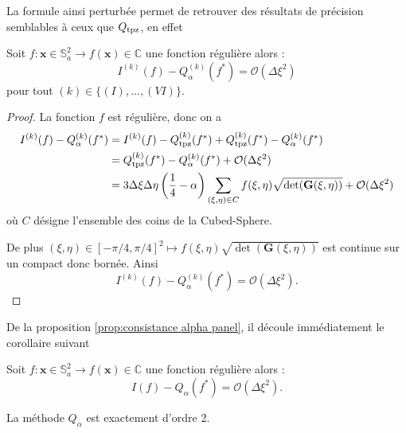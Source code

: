 La formule ainsi perturbée permet de retrouver des résultats de précision semblables à ceux que $Q_{\text{tpz}}$, en effet
\begin{proposition}
Soit $f: \mathbf{x} \in \mathbb{S}_a^2 \rightarrow f(\mathbf{x}) \in \mathbb{C}$ une fonction régulière alors :
\begin{equation}
I^{(k)}(f) - Q^{(k)}_{\alpha}(f^*) = \mathcal{O} \left( \Delta \xi^2 \right)
\end{equation}
pour tout $(k) \in \lbrace (I), ..., (VI) \rbrace$.
\label{prop:consistance alpha panel}
\end{proposition}

\begin{proof}
La fonction $f$ est régulière, donc on a
\begin{align*}
I^{(k)}(f) - Q^{(k)}_{\alpha}(f^*) & = I^{(k)}(f) - Q^{(k)}_{\text{tpz}}(f^*) + Q^{(k)}_{\text{tpz}}(f^*) - Q^{(k)}_{\alpha}(f^*)\\
	& =  Q^{(k)}_{\text{tpz}}(f^*) - Q^{(k)}_{\alpha}(f^*) + \mathcal{O}(\Delta \xi^2) \\
	& = 3\Delta \xi \Delta \eta \left( \dfrac{1}{4} - \alpha \right) \displaystyle\sum\limits_{(\xi, \eta) \in C} f(\xi, \eta) \sqrt{\det(\mathbf{G}(\xi, \eta))}  + \mathcal{O}(\Delta \xi^2)
\end{align*}
où $C$ désigne l'ensemble des coins de la Cubed-Sphere.

De plus $(\xi, \eta) \in [-\pi/4, \pi/4]^2 \mapsto f(\xi, \eta) \sqrt{\det(\mathbf{G}(\xi, \eta))}$ est continue sur un compact donc bornée. Ainsi
\begin{equation}
I^{(k)}(f) - Q^{(k)}_{\alpha}(f^*) = \mathcal{O}(\Delta \xi^2).
\end{equation}
\end{proof}
De la proposition \ref{prop:consistance alpha panel}, il découle immédiatement le corollaire suivant
\begin{corollaire}
Soit $f: \mathbf{x} \in \mathbb{S}_a^2 \rightarrow f(\mathbf{x}) \in \mathbb{C}$ une fonction régulière alors :
\begin{equation}
I(f) - Q_{\alpha}(f^*) = \mathcal{O} \left( \Delta \xi^2 \right).
\end{equation}
\end{corollaire}

\begin{proposition}
La méthode $Q_{\alpha}$ est exactement d'ordre 2.
\end{proposition}

